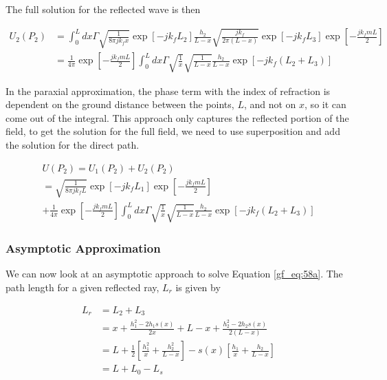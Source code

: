 \noindent The full solution for the reflected wave is then 

\begin{equation}
\begin{aligned}
U_2(P_2) &= \int_0^L dx \Gamma \sqrt{\frac{1}{8\pi j k_f x}}\exp[-jk_fL_2]\frac{h_2}{L-x}\sqrt{\frac{jk_f}{2\pi(L-x)}}\exp[-jk_fL_3]\exp\left[-\frac{jk_fmL}{2}\right]\\
&= \frac{1}{4\pi}\exp\left[-\frac{jk_fmL}{2}\right]\int_0^L dx \Gamma \sqrt{\frac{1}{x}}\sqrt{\frac{1}{L-x}}\frac{h_2}{L-x}\exp\left[-jk_f\left(L_2+L_3\right) \right]
\label{gf_eq:58}
\end{aligned}
\end{equation}
\renewcommand{\baselinestretch}{2} \small\normalsize

In the paraxial approximation, the phase term with the index of refraction is dependent on the ground distance between the points, $L$, and not on $x$, so it can come out of the integral. This approach only captures the reflected portion of the field, to get the solution for the full field, we need to use superposition and add the solution for the direct path.

\begin{equation}
\begin{gathered}
U(P_2) = U_1(P_2) + U_2(P_2)\\
= \sqrt{\frac{1}{8\pi jk_fL}}\exp\left[-jk_fL_1\right]\exp\left[-\frac{jk_fmL}{2}\right] \\
+ \frac{1}{4\pi}\exp\left[-\frac{jk_fmL}{2}\right]\int_0^L dx \Gamma \sqrt{\frac{1}{x}}\sqrt{\frac{1}{L-x}}\frac{h_2}{L-x}\exp\left[-jk_f\left(L_2+L_3\right) \right]
\label{gf_eq:58a}
\end{gathered}
\end{equation}
\renewcommand{\baselinestretch}{2} \small\normalsize

\subsubsection{Asymptotic Approximation}
We can now look at an asymptotic approach to solve Equation \ref{gf_eq:58a}. The path length for a given reflected ray, $L_r$ is given by

\begin{equation}
\begin{aligned}
L_r &= L_2 + L_3 \\
& = x + \frac{h_1^2-2h_1s(x)}{2x} +  L-x + \frac{h_2^2 - 2h_2s(x)}{2\left(L-x\right)} \\
& = L + \frac{1}{2}\left[\frac{h_1^2}{x} + \frac{h_2^2}{L-x} \right] - s(x)\left[ \frac{h_1}{x} + \frac{h_2}{L-x}\right] \\
&= L + L_0 - L_s
\end{aligned}
\label{gf_eq:60}
\end{equation}
\renewcommand{\baselinestretch}{2} \small\normalsize

